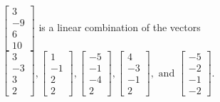 \begin{exercise}
\begin{exerciseStatement}
  \end{exerciseStatement}
  \begin{exerciseAnswer}
   \(\left[\begin{array}{c}
3 \\
-9 \\
6 \\
10
\end{array}\right]\) 
  	 is  
	a linear combination of the vectors \(\left[\begin{array}{c}
3 \\
-3 \\
3 \\
2
\end{array}\right] , \left[\begin{array}{c}
1 \\
-1 \\
2 \\
2
\end{array}\right] , \left[\begin{array}{c}
-5 \\
-1 \\
-4 \\
2
\end{array}\right] , \left[\begin{array}{c}
4 \\
-3 \\
-1 \\
2
\end{array}\right] , \text{ and } \left[\begin{array}{c}
-5 \\
-2 \\
-1 \\
-2
\end{array}\right]\).

	
  


  \end{exerciseAnswer}
\end{exercise}